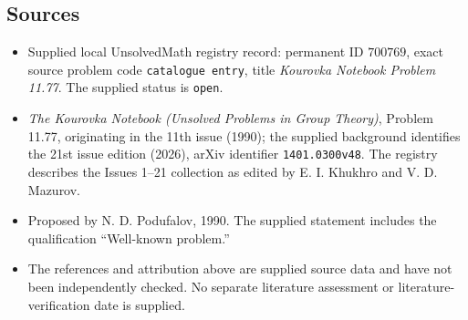 \documentclass[11pt]{article}
\begin{document}
\subsection{Sources}
\begin{itemize}
\item Supplied local UnsolvedMath registry record: permanent ID \(700769\), exact source problem code \texttt{catalogue entry}, title \emph{Kourovka Notebook Problem 11.77}. The supplied status is \texttt{open}.
\item \emph{The Kourovka Notebook (Unsolved Problems in Group Theory)}, Problem 11.77, originating in the 11th issue (1990); the supplied background identifies the 21st issue edition (2026), arXiv identifier \texttt{1401.0300v48}. The registry describes the Issues 1--21 collection as edited by E. I. Khukhro and V. D. Mazurov.
\item Proposed by N. D. Podufalov, 1990. The supplied statement includes the qualification ``Well-known problem.''
\item The references and attribution above are supplied source data and have not been independently checked. No separate literature assessment or literature-verification date is supplied.
\end{itemize}
\end{document}
